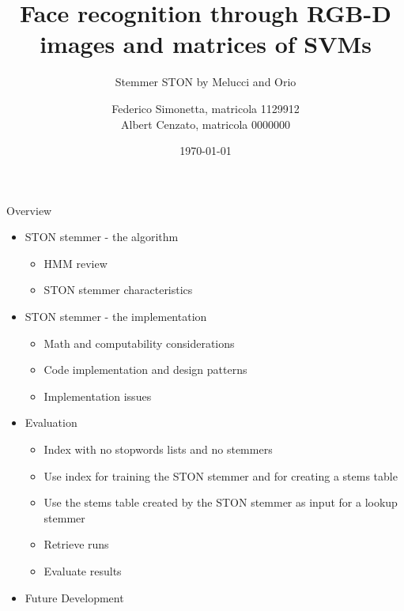 \documentclass{beamer}
\title{Face recognition through RGB-D images and matrices of SVMs} %
\subtitle{Stemmer STON by Melucci and Orio}
\date{\today}
\author{Federico Simonetta, matricola 1129912 \\[1ex] Albert Cenzato, matricola 0000000 }
\begin{document}
\maketitle
{}

\begin{frame}{Overview}
	\begin{itemize}
		\item STON stemmer - the algorithm
			\begin{itemize}
				\item HMM review
				\item STON stemmer characteristics
			\end{itemize}
		\item STON stemmer - the implementation
			\begin{itemize}
				\item Math and computability considerations
				\item Code implementation and design patterns
				\item Implementation issues
			\end{itemize}
		\item Evaluation
			\begin{itemize}
				\item Index with no stopwords lists and no stemmers
				\item Use index for training the STON stemmer and for creating a stems table
				\item Use the stems table created by the STON stemmer as input for a lookup stemmer
				\item Retrieve runs
				\item Evaluate results
			\end{itemize}
		\item Future Development
	\end{itemize}
\end{frame}
\end{document}
